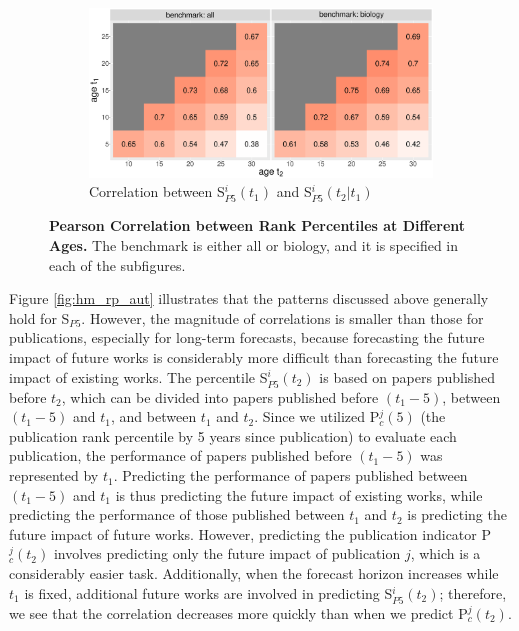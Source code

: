 \begin{figure}[ht!]
    \begin{subfigure}[b]{0.8\textwidth}
        \centering
             \includegraphics[width=\textwidth]{figures/pred_power/heatmap_cor_aut_future.eps}
         \caption{Correlation between S$_{P5}^{i}(t_1)$ and S$_{P5}^{i}(t_2 | t_1)$}
         \label{fig:hm_rp_aut_future}
    \end{subfigure}
    \caption{{\bf Pearson Correlation between Rank Percentiles at Different Ages.} The benchmark is either all or biology, and it is specified in each of the subfigures.}
    \label{fig:hm_rp}
\end{figure}

Figure \ref{fig:hm_rp_aut} illustrates that the patterns discussed above generally hold for S$_{P5}$. However, the magnitude of correlations is smaller than those for publications, especially for long-term forecasts, because forecasting the future impact of future works is considerably more difficult than forecasting the future impact of existing works. The percentile S$_{P5}^{i}(t_2)$ is based on papers published before $t_2$, which can be divided into papers published before $(t_1-5)$, between $(t_1-5)$ and $t_1$, and between $t_1$ and $t_2$. Since we utilized P$_c^{j}(5)$ (the publication rank percentile by 5 years since publication) to evaluate each publication, the performance of papers published before $(t_1-5)$ was represented by $t_1$. Predicting the performance of papers published between $(t_1-5)$ and $t_1$ is thus predicting the future impact of existing works, while predicting the performance of those published between $t_1$ and $t_2$ is predicting the future impact of future works. However, predicting the publication indicator P$_c^{j}(t_2)$ involves predicting only the future impact of publication $j$, which is a considerably easier task. Additionally, when the forecast horizon increases while $t_1$ is fixed, additional future works are involved in predicting S$_{P5}^{i}(t_2)$; therefore, we see that the correlation decreases more quickly than when we predict P$_c^{j}(t_2)$. 

